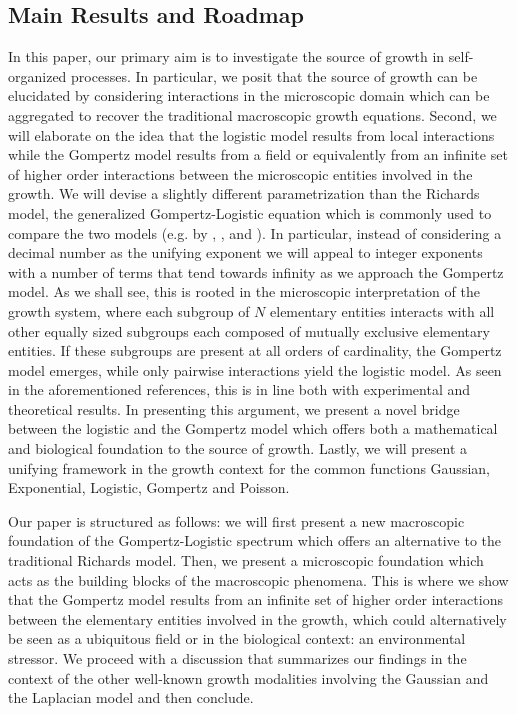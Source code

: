\documentclass{article}
\begin{document}
\subsection{Main Results and Roadmap}
In this paper, our primary aim is to investigate the source of growth in self-organized processes. In particular, we posit that the source of growth can be elucidated by considering interactions in the microscopic domain which can be aggregated to recover the traditional macroscopic growth equations. Second, we will elaborate on the idea that the logistic model results from local interactions while the Gompertz model results from a field or equivalently from an infinite set of higher order interactions between the microscopic entities involved in the growth. We will devise a slightly different parametrization than the Richards model, the generalized Gompertz-Logistic equation which is commonly used to compare the two models (e.g. by \citet{petroni2020logistic}, \citet{tjorve2017use}, and \citet{wang2012richards}). In particular, instead of considering a decimal number as the unifying exponent we will appeal to integer exponents with a number of terms that tend towards infinity as we approach the Gompertz model. As we shall see, this is rooted in the microscopic interpretation of the growth system, where each subgroup of $N$ elementary entities interacts with all other equally sized subgroups each composed of mutually exclusive elementary entities. If these subgroups are present at all orders of cardinality, the Gompertz model emerges, while only pairwise interactions yield the logistic model. As seen in the aforementioned references, this is in line both with experimental and theoretical results. In presenting this argument, we present a novel bridge between the logistic and the Gompertz model which offers both a mathematical and biological foundation to the source of growth. Lastly, we will present a unifying framework in the growth context for the common functions Gaussian, Exponential, Logistic, Gompertz and Poisson.

Our paper is structured as follows: we will first present a new macroscopic foundation of the Gompertz-Logistic spectrum which offers an alternative to the traditional Richards model. Then, we present a microscopic foundation which acts as the building blocks of the macroscopic phenomena. This is where we show that the Gompertz model results from an infinite set of higher order interactions between the elementary entities involved in the growth, which could alternatively be seen as a ubiquitous field or in the biological context: an environmental stressor. We proceed with a discussion that summarizes our findings in the context of the other well-known growth modalities involving the Gaussian and the Laplacian model and then conclude.
\end{document}
